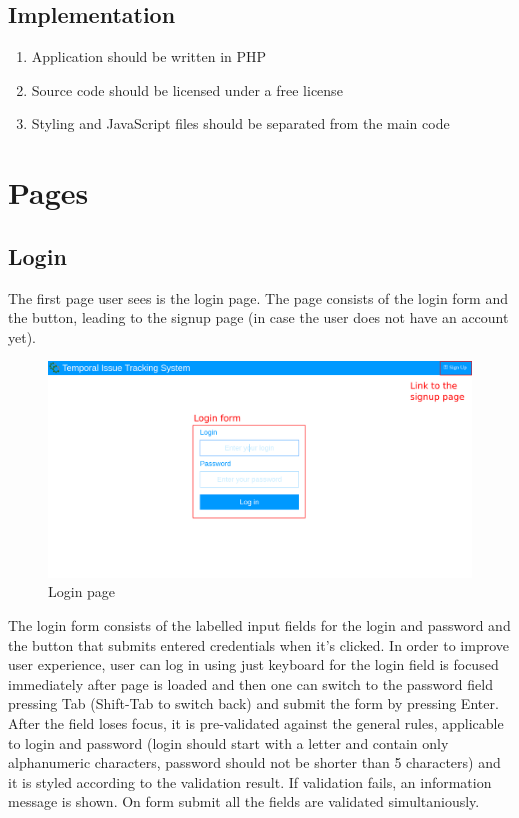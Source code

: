 \documentclass{article}
\begin{document}
    \subsection{Implementation}
    \begin{enumerate}[label=\textbf{IR\arabic*}]
        \item Application should be written in PHP
        \item Source code should be licensed under a free license
        \item Styling and JavaScript files should be separated from the main code
    \end{enumerate}
\section{Pages}
\subsection{Login}
The first page user sees is the login page. The page consists of the login form and the button, leading to the signup page (in case the user does not have an account yet).
\begin{figure}[H]
    \includegraphics[width=\textwidth]{img/login.png}
    \caption{Login page}
\end{figure}
The login form consists of the labelled input fields for the login and password and the button that submits entered credentials when it's clicked. In order to improve user experience, user can log in using just keyboard for the login field is focused immediately after page is loaded and then one can switch to the password field pressing Tab (Shift-Tab to switch back) and submit the form by pressing Enter. After the field loses focus, it is pre-validated against the general rules, applicable to login and password (login should start with a letter and contain only alphanumeric characters, password should not be shorter than 5 characters) and it is styled according to the validation result. If validation fails, an information message is shown. On form submit all the fields are validated simultaniously.
\end{document}
